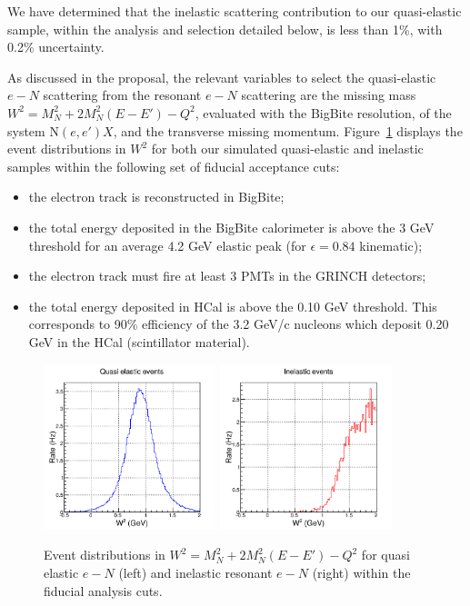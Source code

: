 \documentclass[11pt]{article}
\begin{document}
We have determined that the inelastic scattering contribution to our quasi-elastic sample, within the analysis and selection detailed below, is less than 1\%, with 0.2\% uncertainty.


As discussed in the proposal, the relevant variables to select the quasi-elastic $e-N$ scattering from the resonant $e-N$ scattering are the missing mass $W^2 = M_{N}^2+2M_{N}^{2}(E-E')-Q^2$, evaluated with the BigBite resolution, of the system N$(e, e')X$, and the transverse missing momentum.
Figure~\ref{fig:W2} displays the event distributions in $W^2$ for both our simulated quasi-elastic and inelastic samples within the following set of fiducial acceptance cuts:
%
\begin{itemize}
\item{the electron track is reconstructed in BigBite;}
\item{the total energy deposited in the BigBite calorimeter is above the 3 GeV threshold for an average 4.2 GeV elastic peak (for $\epsilon = 0.84$ kinematic);}
\item{the electron track must fire at least 3 PMTs in the GRINCH detectors;}
\item{the total energy deposited in HCal is above the 0.10 GeV threshold. This corresponds to 90\% efficiency of the 3.2 GeV/c nucleons which deposit 0.20 GeV in the HCal (scintillator material).}
\end{itemize}
%
%
\begin{figure}[h]
  \centering
    \includegraphics[width=5cm]{W2_sig.pdf}
    \includegraphics[width=5cm]{W2_inel.pdf}
    \caption{Event distributions in $W^2 = M_{N}^2+2M_{N}^{2}(E-E')-Q^2$  for quasi elastic $e-N$ (left) and inelastic resonant $e-N$ (right) within the fiducial analysis cuts.}
    \label{fig:W2}
\end{figure}
%
\end{document}
